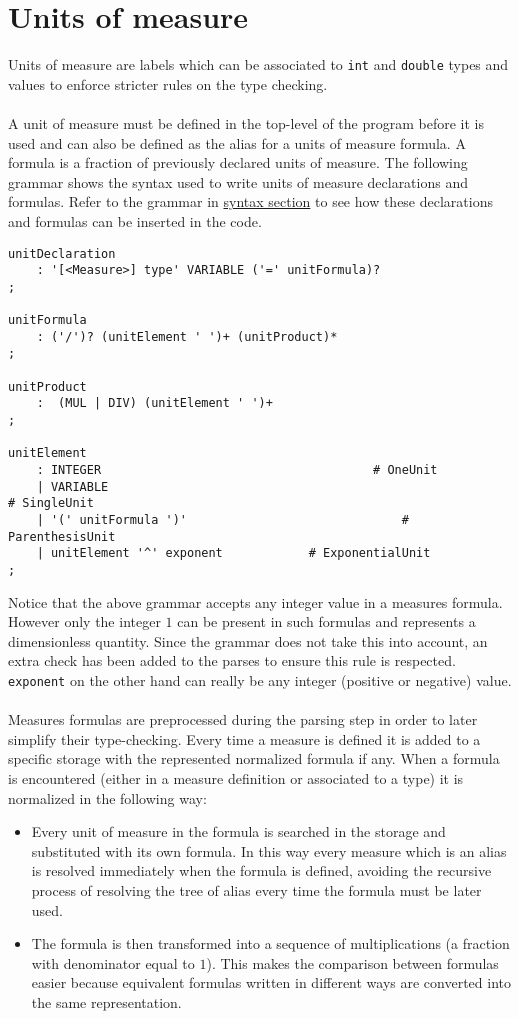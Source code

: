 \documentclass[]{article}
\begin{document}
	\section{Units of measure}
	\label{sec:UOM}
		Units of measure are labels which can be associated to \lstinline|int| and \lstinline|double| types and values to enforce stricter rules on the type checking.\\\\
		A unit of measure must be defined in the top-level of the program before it is used and can also be defined as the alias for a units of measure formula. A formula is a fraction of previously declared units of measure. The following grammar shows the syntax used to write units of measure declarations and formulas. Refer to the grammar in \hyperref[sec:syntax]{syntax section} to see how these declarations and formulas can be inserted in the code.
		\begin{lstlisting}[caption={Units of measure grammar}, label=UOMGrammar]
unitDeclaration
	: '[<Measure>] type' VARIABLE ('=' unitFormula)?
;

unitFormula
	: ('/')? (unitElement ' ')+ (unitProduct)*
;

unitProduct
	:  (MUL | DIV) (unitElement ' ')+
;

unitElement
	: INTEGER                                      # OneUnit
	| VARIABLE                                                          # SingleUnit
	| '(' unitFormula ')'                              # ParenthesisUnit
	| unitElement '^' exponent            # ExponentialUnit
;
		\end{lstlisting}
		Notice that the above grammar accepts any integer value in a measures formula. However only the integer $1$ can be present in such formulas and represents a dimensionless quantity. Since the grammar does not take this into account, an extra check has been added to the parses to ensure this rule is respected. \lstinline|exponent| on the other hand can really be any integer (positive or negative) value.\\\\
		Measures formulas are preprocessed during the parsing step in order to later simplify their type-checking. Every time a measure is defined it is added to a specific storage with the represented normalized formula if any. When a formula is encountered (either in a measure definition or associated to a type) it is normalized in the following way:
		\begin{itemize}
			\item Every unit of measure in the formula is searched in the storage and substituted with its own formula. In this way every measure which is an alias is resolved immediately when the formula is defined, avoiding the recursive process of resolving the tree of alias every time the formula must be later used.
			\item The formula is then transformed into a sequence of multiplications (a fraction with denominator equal to $1$). This makes the comparison between formulas easier because equivalent formulas written in different ways are converted into the same representation.
		\end{itemize}
\end{document}
